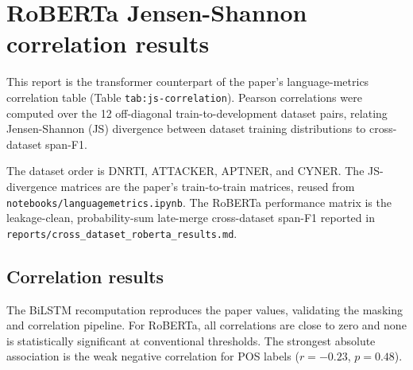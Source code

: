 \section*{RoBERTa Jensen-Shannon correlation results}

This report is the transformer counterpart of the paper's language-metrics correlation table (Table \texttt{tab:js-correlation}). Pearson correlations were computed over the 12 off-diagonal train-to-development dataset pairs, relating Jensen-Shannon (JS) divergence between dataset training distributions to cross-dataset span-F1.

The dataset order is DNRTI, ATTACKER, APTNER, and CYNER. The JS-divergence matrices are the paper's train-to-train matrices, reused from \texttt{notebooks/languagemetrics.ipynb}. The RoBERTa performance matrix is the leakage-clean, probability-sum late-merge cross-dataset span-F1 reported in \texttt{reports/cross\_dataset\_roberta\_results.md}.

\subsection*{Correlation results}

\begin{table}[h!]
\centering
{}%
\caption{Pearson correlations between JS divergence and cross-dataset span-F1 over off-diagonal dataset pairs.}
\label{tab:roberta_js_correlation}
\end{table}

The BiLSTM recomputation reproduces the paper values, validating the masking and correlation pipeline. For RoBERTa, all correlations are close to zero and none is statistically significant at conventional thresholds. The strongest absolute association is the weak negative correlation for POS labels ($r=-0.23$, $p=0.48$).

